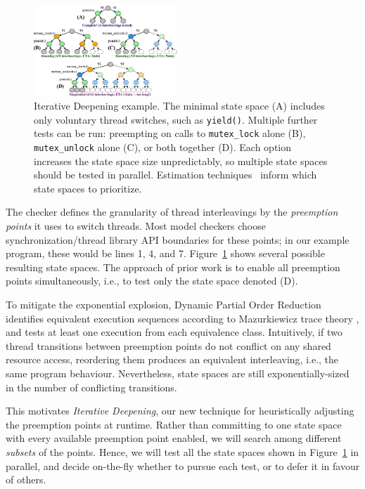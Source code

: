 \begin{figure}[t]
	\includegraphics[width=0.48\textwidth]{trees-v2-squashed.pdf}
	\caption{Iterative Deepening example.
		The minimal state space (A) includes only voluntary thread switches, such as {\tt yield()}. %
		Multiple further tests can be run: preempting on calls to {\tt mutex\_lock} alone (B), {\tt mutex\_unlock} alone (C), or both together (D).
Each option increases the state space size unpredictably, so multiple state spaces should be tested in parallel.
Estimation techniques~\cite{estimation} inform which state spaces to prioritize.
}
	\label{fig:id}
\end{figure}

The checker defines the granularity of thread interleavings by the {\em preemption points} it uses to switch threads.
Most model checkers \cite{chess,dbug-ssv} choose synchronization/thread library API boundaries for these points;
in our example program, these would be lines 1, 4, and 7.
Figure~\ref{fig:id} shows several possible resulting state spaces.
The approach of prior work is to enable all preemption points simultaneously, i.e., to test only the state space denoted (D).

To mitigate the exponential explosion,
Dynamic Partial Order Reduction \cite{dpor} identifies equivalent execution sequences according to Mazurkiewicz trace theory \cite{mazurkiewicz},
and tests at least one execution from each equivalence class.
Intuitively, if two thread transitions between preemption points do not conflict on any shared resource access, reordering them produces an equivalent interleaving, i.e., the same program behaviour.
Nevertheless, state spaces are still exponentially-sized in the number of conflicting transitions.

This motivates {\em Iterative Deepening}, our new technique for heuristically adjusting the preemption points at runtime.
Rather than committing to one state space with every available preemption point enabled,
we will search among different {\em subsets} of the points.
Hence, we will test all the state spaces shown in Figure~\ref{fig:id} in parallel,
and decide on-the-fly whether to pursue each test, or to defer it in favour of others.

